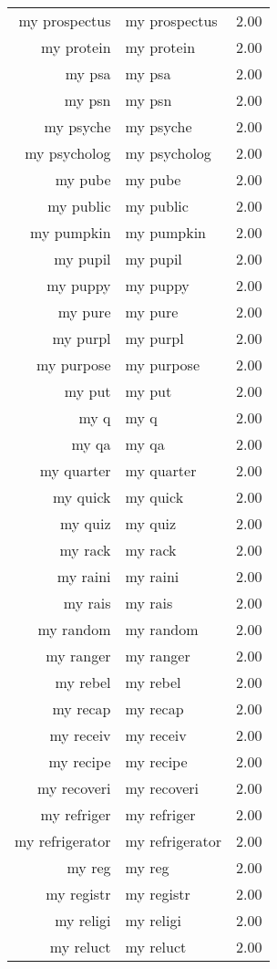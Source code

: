 \begin{table}[ht]
\begin{tabular}{rlr}
  my prospectus & my prospectus & 2.00 \\ 
  my protein & my protein & 2.00 \\ 
  my psa & my psa & 2.00 \\ 
  my psn & my psn & 2.00 \\ 
  my psyche & my psyche & 2.00 \\ 
  my psycholog & my psycholog & 2.00 \\ 
  my pube & my pube & 2.00 \\ 
  my public & my public & 2.00 \\ 
  my pumpkin & my pumpkin & 2.00 \\ 
  my pupil & my pupil & 2.00 \\ 
  my puppy & my puppy & 2.00 \\ 
  my pure & my pure & 2.00 \\ 
  my purpl & my purpl & 2.00 \\ 
  my purpose & my purpose & 2.00 \\ 
  my put & my put & 2.00 \\ 
  my q & my q & 2.00 \\ 
  my qa & my qa & 2.00 \\ 
  my quarter & my quarter & 2.00 \\ 
  my quick & my quick & 2.00 \\ 
  my quiz & my quiz & 2.00 \\ 
  my rack & my rack & 2.00 \\ 
  my raini & my raini & 2.00 \\ 
  my rais & my rais & 2.00 \\ 
  my random & my random & 2.00 \\ 
  my ranger & my ranger & 2.00 \\ 
  my rebel & my rebel & 2.00 \\ 
  my recap & my recap & 2.00 \\ 
  my receiv & my receiv & 2.00 \\ 
  my recipe & my recipe & 2.00 \\ 
  my recoveri & my recoveri & 2.00 \\ 
  my refriger & my refriger & 2.00 \\ 
  my refrigerator & my refrigerator & 2.00 \\ 
  my reg & my reg & 2.00 \\ 
  my registr & my registr & 2.00 \\ 
  my religi & my religi & 2.00 \\ 
  my reluct & my reluct & 2.00 \\ 

\end{tabular}
\end{table}
